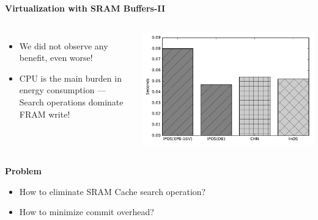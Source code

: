 \begin{frame}{\textbf{Virtualization with SRAM Buffers-II}}
	\begin{columns}		
		
		\begin{itemize}
			\item We did not observe any benefit, even worse!
			\item CPU is the main burden in energy consumption --- Search operations dominate FRAM write!
		\end{itemize}
		
		
		\includegraphics[scale=0.3]{images/sram-sw-buffer.pdf}	
	\end{columns}

	
	\begin{alertblock}{\textbf{Problem}}
	\begin{itemize}
		\item How to eliminate SRAM Cache search operation? 
		\item How to minimize commit overhead?
	\end{itemize}	
	\end{alertblock}

	
\end{frame}



